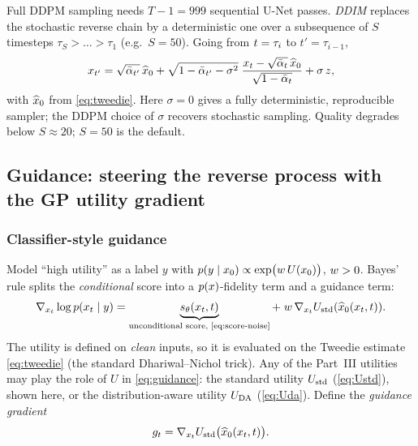 Full DDPM sampling needs $T-1=999$ sequential U-Net passes. \emph{DDIM} replaces
the stochastic reverse chain by a deterministic one over a subsequence of $S$
timesteps $\tau_{S}>\dots>\tau_{1}$ (e.g.\ $S=50$). Going from $t=\tau_{i}$ to
$t'=\tau_{i-1}$,
\begin{equation}
x_{t'}=\sqrt{\bar\alpha_{t'}}\,\widehat{x}_{0}
   +\sqrt{1-\bar\alpha_{t'}-\sigma^{2}}\;
     \frac{x_{t}-\sqrt{\bar{\alpha}_{t}}\,\widehat{x}_{0}}{\sqrt{1-\bar{\alpha}_{t}}}
   +\sigma\,z,
\label{eq:ddim}
\end{equation}
with $\widehat{x}_{0}$ from \eqref{eq:tweedie}. Here $\sigma=0$ gives a fully deterministic,
reproducible sampler; the DDPM choice of $\sigma$ recovers stochastic sampling.
Quality degrades below $S\!\approx\!20$; $S=50$ is the default.

\subsection{Guidance: steering the reverse process with the GP utility gradient}
\label{sec:diff-guide}

\subsubsection{Classifier-style guidance}
Model ``high utility'' as a label $y$ with $p(y\mid x_{0})\propto\exp\!\big(w\,
U(x_{0})\big)$, $w>0$. Bayes' rule splits the \emph{conditional} score into a
$p(x)$-fidelity term and a guidance term:
\begin{equation}
\nabla_{x_{t}}\log p(x_{t}\mid y)
  =\underbrace{s_{\theta}(x_{t},t)}_{\text{unconditional score, \eqref{eq:score-noise}}}
  +\;w\,\nabla_{x_{t}}U_{\mathrm{std}}(\widehat{x}_{0}(x_{t},t)).
\label{eq:guidance}
\end{equation}
The utility is defined on \emph{clean} inputs, so it is evaluated on the Tweedie
estimate \eqref{eq:tweedie} (the standard Dhariwal--Nichol trick). Any of the
Part~III utilities may play the role of $U$ in \eqref{eq:guidance}: the standard
utility $U_{\mathrm{std}}$ (\eqref{eq:Ustd}), shown here, or the distribution-aware utility
$U_{\mathrm{DA}}$ (\eqref{eq:Uda}). Define the \emph{guidance gradient}
\begin{equation}
g_{t}=\nabla_{x_{t}}U_{\mathrm{std}}\big(\widehat{x}_{0}(x_{t},t)\big).
\label{eq:ggrad}
\end{equation}


